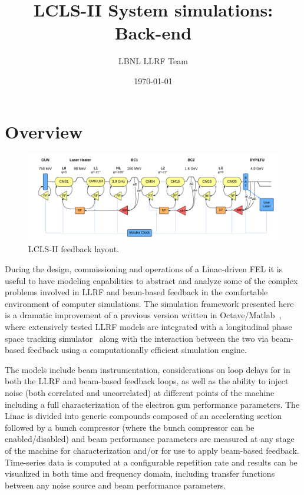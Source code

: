 \documentclass[a4paper,12pt]{article}
\title{\textbf{LCLS-II System simulations:\\Back-end}}
\author{LBNL LLRF Team}
\date{\today}
\begin{document}
\maketitle
\setcounter{tocdepth}{3}
\tableofcontents

\newpage

\section{Overview}

\begin{figure}
\centering
\includegraphics[scale=0.11]{../figures/LCLS-II_feedback_layout.png}
\caption{LCLS-II feedback layout.}
\label{fig:lclsII-feedback_layout}
\end{figure}

During the design, commissioning and operations of a Linac-driven FEL it is useful to have modeling capabilities to abstract and analyze some of the complex problems involved in LLRF and beam-based feedback in the comfortable environment of computer simulations. The simulation framework presented here is a dramatic improvement of a previous version written in Octave/Matlab~\cite{ref:model-paper}, where extensively tested LLRF models are integrated with a longitudinal phase space tracking simulator~\cite{ref:litrack} along with the interaction between the two via beam-based feedback using a computationally efficient simulation engine. 

The models include beam instrumentation, considerations on loop delays for in both the LLRF and beam-based feedback loops, as well as the ability to inject noise (both correlated and uncorrelated) at different points of the machine including a full characterization of the electron gun performance parameters. The Linac is divided into generic compounds composed of an accelerating section followed by a bunch compressor (where the bunch compressor can be enabled/disabled) and beam performance parameters are measured at any stage of the machine for characterization and/or for use to apply beam-based feedback. Time-series data is computed at a configurable repetition rate and results can be visualized in both time and frequency domain, including transfer functions between any noise source and beam performance parameters.
\end{document}
